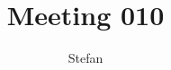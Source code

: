 \documentclass[a4paper,final]{article}
\title{Meeting 010}
\author{Stefan}
\begin{document}

\newcommand{\Noc}{\textsc{NoC}\xspace}%
\newcommand{\w}[1]{\textsc{#1}\xspace}%
\newcommand{\qml}{\textsc{Qml}\xspace}%
\newcommand{\qt}{\textsc{Qt}\xspace}%
\newcommand{\qtquick}{\textsc{QtQuick}\xspace}%
\newcommand{\cpp}{\textsc{C++}\xspace}%
\newcommand{\code}[1]{\texttt{#1}\xspace}%
\newcommand{\xmas}{\textsc{xmas}\xspace}%
\newcommand{\xmv}{\textsc{Xmv}\xspace}%
\newcommand{\xmd}{\textsc{Xmd}\xspace}%
\newcommand{\xmvtest}{\textsc{XmvTest}\xspace}%
\newcommand{\xmdtest}{\textsc{XmdTest}\xspace}%
\newcommand{\bitpowder}{\textsc{Bitpowder}\xspace}%
\newcommand{\datamodel}{\textsc{datamodel}\xspace}%
\newcommand{\vt}{\textsc{Vt}\xspace}%
\newcommand{\src}{\textsc{src}\xspace}%
\newcommand{\agilefant}{\textsc{AgileFant}\xspace}%
\newcommand{\een}{\'{e}\'{e}n\xspace}%
\newcommand{\svn}{\textsc{svn}\xspace}%
\newcommand{\git}{\textsc{git}\xspace}%
\newcommand{\github}{\textsc{Github}\xspace}%
\newcommand{\subversion}{\textsc{subversion}\xspace}%
\newcommand{\radboud}{\textsc{Radboud}\xspace}%
\newcommand{\uml}{\textsc{uml}\xspace}%
\end{document}

